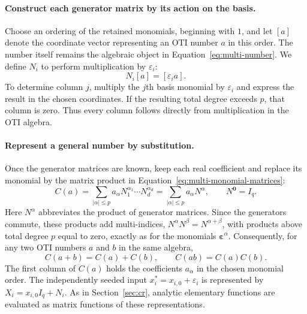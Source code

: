 \paragraph{Construct each generator matrix by its action on the basis.}
Choose an ordering of the retained monomials, beginning with $1$, and let
$[a]$ denote the coordinate vector representing an OTI number $a$ in this
order. The number itself remains the algebraic object in
Equation~\eqref{eq:multi-number}. We define $N_i$ to perform multiplication
by $\varepsilon_i$:
\begin{equation}
 \label{eq:multi-shift}
 \boxed{N_i[a]=[\varepsilon_i a].}
\end{equation}
To determine column $j$, multiply the $j$th basis monomial by
$\varepsilon_i$ and express the result in the chosen coordinates.
If the resulting total degree exceeds $p$, that column is zero.
Thus every column follows directly from multiplication in the OTI algebra.

\paragraph{Represent a general number by substitution.}
Once the generator matrices are known, keep each real coefficient and
replace its monomial by the matrix product in
Equation~\eqref{eq:multi-monomial-matrices}:
\begin{equation}
\label{eq:multi-cr}
 \boxed{C(a)=\sum_{|\alpha|\leq p}a_\alpha
 N_1^{\alpha_1}\cdots N_d^{\alpha_d}
 =\sum_{|\alpha|\leq p}a_\alpha N^\alpha},
 \qquad N^{\boldsymbol0}=I_q.
\end{equation}
Here $N^\alpha$ abbreviates the product of generator matrices. Since the
generators commute, these products add multi-indices,
$N^\alpha N^\beta=N^{\alpha+\beta}$, with products above total degree $p$
equal to zero, exactly as for the monomials $\boldsymbol\varepsilon^\alpha$.
Consequently, for any two OTI numbers $a$ and $b$ in the same algebra,
\begin{equation}
 \label{eq:multi-multiplication-action}
 C(a+b)=C(a)+C(b),\qquad C(ab)=C(a)C(b).
\end{equation}
The first column of $C(a)$ holds the coefficients $a_\alpha$ in the chosen
monomial order. The independently seeded input
$x_i^*=x_{i,0}+\varepsilon_i$ is represented by $X_i=x_{i,0}I_q+N_i$.
As in Section~\ref{sec:cr}, analytic elementary functions are evaluated
as matrix functions of these representations.

\newpage
